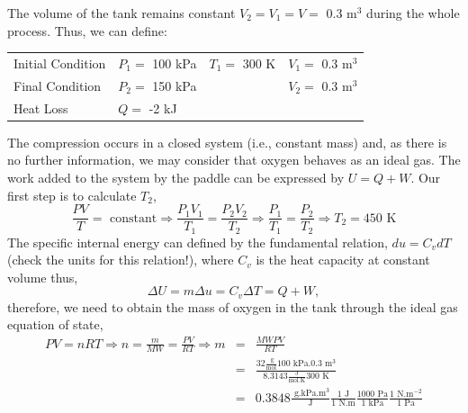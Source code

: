\documentclass[12pts,a4paper,amsmath,amssymb,floatfix]{article}%
\newcommand{\frc}{\displaystyle\frac}
\begin{document}
\begin{enumerate}[1)]
        The volume of the tank remains constant $V_{2}=V_{1}=V=$ 0.3 m$^{3}$ during the whole process. Thus, we can define:
            \begin{center}
              \begin{tabular}{l l l l}
                 Initial Condition & $P_{1}=$ 100 kPa   & $T_{1}=$ 300 K         & $V_{1}=$ 0.3 m$^{3}$  \\
                 Final Condition   & $P_{2}=$ 150 kPa   &                       & $V_{2}=$ 0.3 m$^{3}$ \\
                 Heat Loss         & $Q=$ -2 kJ        &                       &                    
              \end{tabular}
            \end{center}
       The compression occurs in a closed system (i.e., constant mass) and, as there is no further information, we may consider that oxygen behaves as an ideal gas. The work added to the system by the paddle can be expressed by $U=Q+W$. Our first step is to calculate $T_{2}$,
       \begin{displaymath}
          \frc{P V}{T} = \text{ constant} \Rightarrow \frc{P_{1}V_{1}}{T_{1}} = \frc{P_{2}V_{2}}{T_{2}} \Rightarrow \frc{P_{1}}{T_{1}}=\frc{P_{2}}{T_{2}} \Rightarrow T_{2} = 450\text{ K}
       \end{displaymath}
        The specific internal energy can defined by the fundamental relation, $du=C_{v}dT$ (check the units for this relation!), where $C_{v}$ is the heat capacity at constant volume thus,
       \begin{displaymath}
          \Delta U = m\Delta u = C_{v}\Delta T = Q + W,
       \end{displaymath}
       therefore, we need to obtain the mass of oxygen in the tank through the ideal gas equation of state,
       \begin{eqnarray}
         P V = n R T \Rightarrow n = \frc{m}{MW} = \frc{P V}{R T} \Rightarrow m &=& \frc{ MW P V}{R T} \nonumber \\
                                                      &=& \frc{ 32\frc{\text{ g}}{\text{mol}} 100\text{ kPa} . 0.3\text{ m}^{3}}{ 8.3143 \frc{\text{J}}{\text{mol.K}} 300\text{ K}} \nonumber \\
                                                      &=& 0.3848 \frc{\text{ g.kPa.m}^{3}}{\text{J}} \frc{1 \text{ J}}{1\text{ N.m}} \frc{1000 \text{ Pa}}{1 \text{ kPa}} \frc{ 1 \text{ N.m}^{-2}}{1\text{ Pa}} \nonumber\\

\end{eqnarray}
\end{enumerate}
\end{document}

